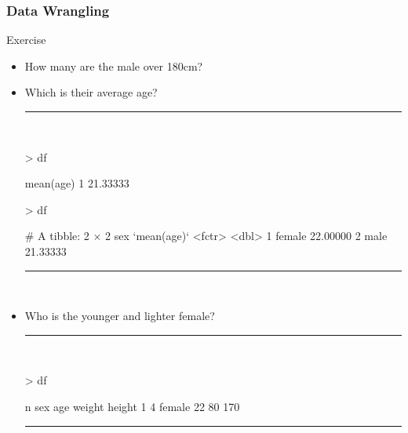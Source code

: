 \documentclass{beamer}
\begin{document}
\begin{frame}[fragile]
	\frametitle{Data Wrangling}
	\centering \LARGE Exercise
	\begin{itemize}
		\small
	\item How many are the male over 180cm? 
		\item Which is their average age?
\rule{\textwidth}{0.4pt}\\
\tiny
\setlength{\fancyvrbtopsep}{-1pt}
\setlength{\fancyvrbpartopsep}{-1pt}
\begin{Schunk}
\begin{Sinput}
> df %
\end{Sinput}
\begin{Soutput}
  mean(age)
1  21.33333
\end{Soutput}
\begin{Sinput}
> df %
\end{Sinput}
\begin{Soutput}
# A tibble: 2 × 2
     sex `mean(age)`
  <fctr>       <dbl>
1 female    22.00000
2   male    21.33333
\end{Soutput}
\end{Schunk}
\rule{\textwidth}{0.4pt}\\
\small
		\item Who is the younger and lighter female? 
		\rule{\textwidth}{0.4pt}\\
\tiny
\setlength{\fancyvrbtopsep}{-1pt}
\setlength{\fancyvrbpartopsep}{-1pt}
\begin{Schunk}
\begin{Sinput}
> df %
\end{Sinput}
\begin{Soutput}
  n    sex age weight height
1 4 female  22     80    170
\end{Soutput}
\end{Schunk}
\rule{\textwidth}{0.4pt}\\
\small

	\end{itemize}
	\small
\end{frame}
\end{document}
